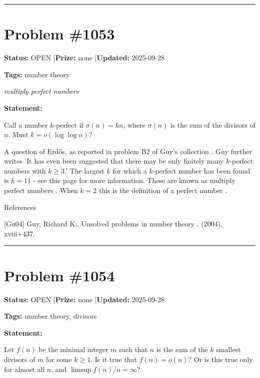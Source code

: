 \documentclass{article}
\begin{document}
\noindent\rule{\linewidth}{0.4pt}


\section{Problem \#1053}
\label{prob:1053}

\noindent\textbf{Status:} OPEN \quad|\quad \textbf{Prize:} none \quad|\quad \textbf{Updated:} 2025-09-28

\noindent\textbf{Tags:} number theory

\medskip
\noindent\textit{multiply perfect numbers}


\noindent\textbf{Statement:}

Call a number $k$-perfect if $\sigma(n)=kn$, where $\sigma(n)$ is the sum of the divisors of $n$. Must $k=o(\log\log n)$?




A question of Erd\H{o}s, as reported in problem B2 of Guy's collection \cite{Gu04}. Guy further writes 'It has even been suggested that there may be only finitely many $k$-perfect numbers with $k\geq 3$.' The largest $k$ for which a $k$-perfect number has been found is $k=11$ - see this page for more information. These are known as multiply perfect numbers . When $k=2$ this is the definition of a perfect number .




References

[Gu04] Guy, Richard K., Unsolved problems in number theory . (2004), xviii+437.

\noindent\rule{\linewidth}{0.4pt}


\section{Problem \#1054}
\label{prob:1054}

\noindent\textbf{Status:} OPEN \quad|\quad \textbf{Prize:} none \quad|\quad \textbf{Updated:} 2025-09-28

\noindent\textbf{Tags:} number theory, divisors

\medskip

\noindent\textbf{Statement:}

Let $f(n)$ be the minimal integer $m$ such that $n$ is the sum of the $k$ smallest divisors of $m$ for some $k\geq 1$. Is it true that $f(n)=o(n)$? Or is this true only for almost all $n$, and $\limsup f(n)/n=\infty$?
\end{document}

